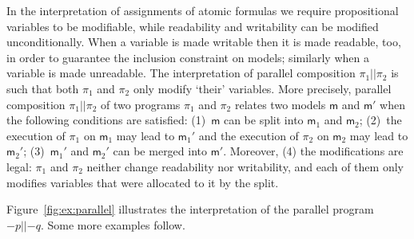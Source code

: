 \documentclass{llncs}
\newcommand{\modl}{\mathsf m}
\newcommand{\pll}{ {||} }							%
\newcommand{\assgnbotV}[1]{{\mathtt {-} #1}}
\begin{document}
In the interpretation of assignments of atomic formulas we require 
propositional variables to be modifiable, while 
readability and writability can be modified unconditionally.
When a variable is made writable then it is made readable, too, 
in order to guarantee the inclusion constraint on models; 
similarly when a variable is made unreadable. 
%
The interpretation of parallel composition $\pi_1 \pll \pi_2$ is such that both $\pi_1$ and $\pi_2$ only modify `their' variables. 
More precisely, parallel composition $\pi_1 \pll \pi_2$ of two programs $\pi_1$ and $\pi_2$ 
relates two models $\modl$ and $\modl'$ when the following conditions are satisfied:
(1)~$\modl$ can be split into $\modl_1$ and $\modl_2$; 
(2)~the execution of $\pi_1$ on $\modl_1$ may lead to $\modl_1'$ and 
    the execution of $\pi_2$ on $\modl_2$ may lead to $\modl_2'$;
(3)~$\modl_1'$ and $\modl_2'$ can be merged into $\modl'$. 
Moreover, 
(4) the modifications are legal: $\pi_1$ and $\pi_2$ neither change readability nor writability, and 
each of them only modifies variables that were allocated to it by the split. 

Figure~\ref{fig:ex:parallel} illustrates the interpretation of the parallel program $\assgnbotV p \pll \assgnbotV q$. 
Some more examples follow. 
\end{document}
